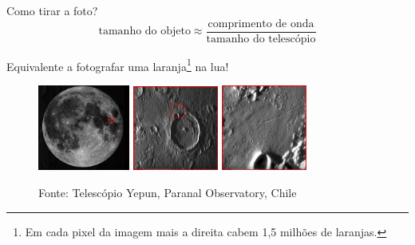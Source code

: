 \documentclass{beamer}
\begin{document}
\begin{frame}{Como tirar a foto?}
    \[\text{tamanho do objeto} \approx \displaystyle\frac{\text{comprimento de
    onda}}{\text{tamanho do telesc\'opio}}\]
    \begin{center}
        Equivalente a fotografar uma laranja\footnote{Em cada pixel da imagem
        mais a direita cabem 1,5 milh\~oes de laranjas.} na lua!
    \end{center}
    \begin{figure}
        \includegraphics[width=0.27\textwidth]{figs/lua1.png}
        \includegraphics[width=0.25\textwidth]{figs/lua2.png}
        \includegraphics[width=0.25\textwidth]{figs/lua3.png}
        \caption{Fonte: Telesc\'opio Yepun, Paranal Observatory, Chile}
    \end{figure}
\end{frame}
\end{document}
